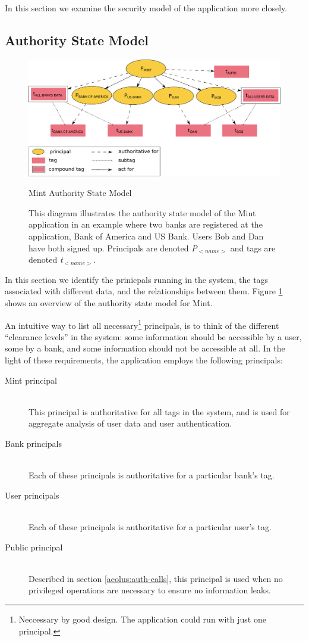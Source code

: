 In this section we examine the security model of the application more closely.

\subsection{Authority State Model}

\begin{figure}[h]
\centering
\includegraphics[width=\textwidth,height=\textheight,keepaspectratio]{figures/mint-auth-state-model}
\caption*{Mint Authority State Model}
\caption[Mint Authority State Model]{This diagram illustrates the authority state model of the Mint application in an example where two banks are registered at the application, Bank of America and US Bank. Users Bob and Dan have both signed up. Principals are denoted \emph{P$_{<name>}$} and tags are denoted \emph{t$_{<name>}$}.}
\label{fig:mint-auth-state-model}
\end{figure}


In this section we identify the prinicpals running in the system, the tags associated with different data, and the relationships between them. Figure \ref{fig:mint-auth-state-model} shows an overview of the authority state model for Mint.

An intuitive way to list all necessary\footnote{Neccessary by good design. The application could run with just one principal.} principals, is to think of the different ``clearance levels'' in the system: some information should be accessible by a user, some by a bank, and some information should not be accessible at all. In the light of these requirements, the application employs the following principals:
\begin{description}
  \item[Mint principal] \ \\
    This principal is authoritative for all tags in the system, and is
    used for aggregate analysis of user data and
    user authentication.
  \item[Bank principals] \ \\
    Each of these principals is authoritative for a particular bank's tag.
  \item[User principals] \ \\
    Each of these principals is authoritative for a particular user's tag.
  \item[Public principal] \ \\
    Described in section \ref{aeolus:auth-calls}, this
    principal is used when no privileged operations are 
    necessary to ensure no information leaks.
\end{description}

